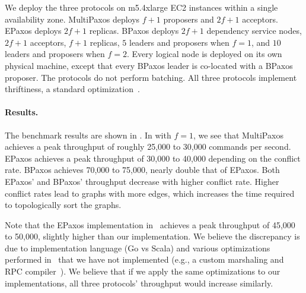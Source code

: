 We deploy the three protocols on m5.4xlarge EC2 instances within a single
availability zone. MultiPaxos deploys $f+1$ proposers and $2f+1$ acceptors.
EPaxos deploys $2f+1$ replicas. BPaxos deploys $2f+1$ dependency service nodes,
$2f+1$ acceptors, $f+1$ replicas, $5$ leaders and proposers when $f=1$, and
$10$ leaders and proposers when $f=2$. Every logical node is deployed on its
own physical machine, except that every BPaxos leader is co-located with a
BPaxos proposer. The protocols do not perform batching. All three protocols
implement thriftiness, a standard optimization~\cite{moraru2013there}.


\paragraph{Results.}
The benchmark results are shown in . In  with
$f=1$, we see that MultiPaxos achieves a peak throughput of roughly 25,000 to
30,000 commands per second. EPaxos achieves a peak throughput of 30,000 to
40,000 depending on the conflict rate. BPaxos achieves 70,000 to 75,000,
nearly double that of EPaxos. Both EPaxos' and BPaxos' throughput decrease with
higher conflict rate. Higher conflict rates lead to graphs with more edges,
which increases the time required to topologically sort the graphs.

Note that the EPaxos implementation in~\cite{moraru2013there} achieves a peak
throughput of 45,000 to 50,000, slightly higher than our implementation. We
believe the discrepancy is due to implementation language (Go vs Scala) and
various optimizations performed in~\cite{moraru2013there} that we have not
implemented (e.g., a custom marshaling and RPC compiler~\cite{epaxos2019blog}).
We believe that if we apply the same optimizations to our implementations, all
three protocols' throughput would increase similarly.


